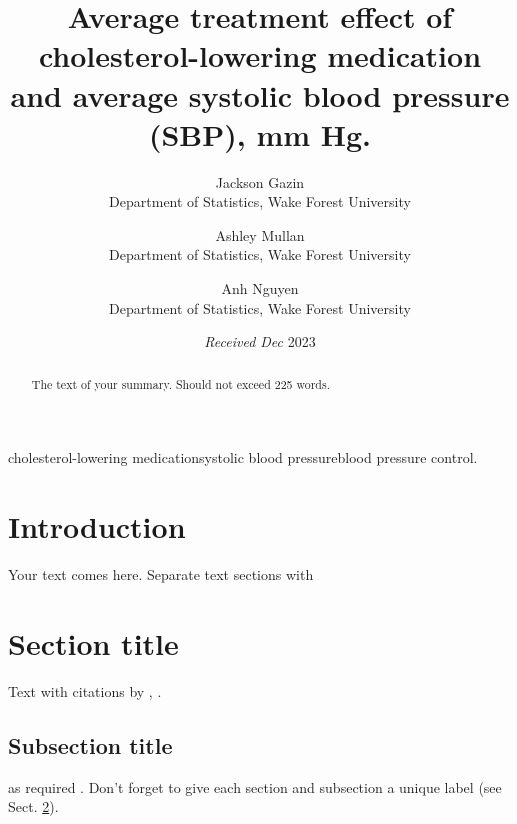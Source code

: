 \documentclass[useAMS,usenatbib,referee]{biom}
\title[]{Average treatment effect of cholesterol-lowering medication and
average systolic blood pressure (SBP), mm Hg.}
\author{ Jackson
Gazin \email{\href{mailto:abc@def}{\nolinkurl{abc@def}}} \\ Department
of Statistics, Wake Forest University  \and
		 Ashley
Mullan \email{\href{mailto:djf@wef}{\nolinkurl{djf@wef}}} \\ Department
of Statistics, Wake Forest University  \and
		 Anh
Nguyen \email{\href{mailto:nguyp22@wfu.edu}{\nolinkurl{nguyp22@wfu.edu}}} \\ Department
of Statistics, Wake Forest University 
	   }
\begin{document}
\date{{\it Received Dec} 2023}

\pagerange{\pageref{firstpage}--\pageref{lastpage}} 



\label{firstpage}


\begin{abstract}
The text of your summary. Should not exceed 225 words.
\end{abstract}

%
%

\begin{keywords}
cholesterol-lowering medicationsystolic blood pressureblood pressure
control.
\end{keywords}

\maketitle

\hypertarget{intro}{%
\section{Introduction}\label{intro}}

Your text comes here. Separate text sections with

\hypertarget{sec:1}{%
\section{Section title}\label{sec:1}}

Text with citations by \citet{heagerty2000time},
\citep{pepe2003statistical}.

\hypertarget{sec:2}{%
\subsection{Subsection title}\label{sec:2}}

as required \citep{hoerl1970ridge, zou2005regularization}. Don't forget
to give each section and subsection a unique label (see Sect.
\ref{sec:1}).
\end{document}
